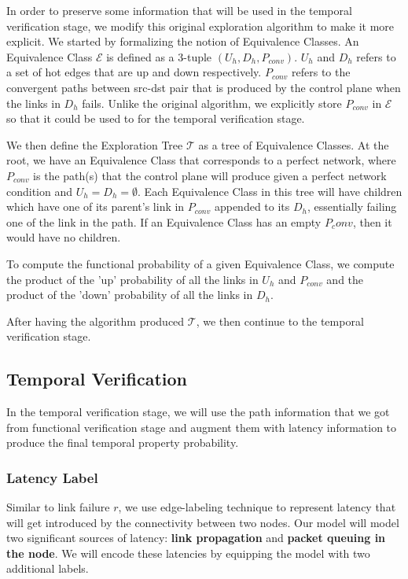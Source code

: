 \documentclass[10pt,sigconf,letterpaper,anonymous,nonacm]{acmart}
\begin{document}
In order to preserve some information that will be used in the temporal verification 
stage, we modify this original exploration algorithm to make it more explicit.
We started by formalizing the notion of Equivalence Classes.
An Equivalence Class $\mathcal{E}$ is defined as a 3-tuple $(U_h, D_h, P_{conv})$.
$U_h$ and $D_h$ refers to a set of hot edges that are up and down respectively.
$P_{conv}$ refers to the convergent paths between src-dst pair that is produced by the
control plane when the links in $D_h$ fails.
Unlike the original algorithm, we explicitly store $P_{conv}$ in $\mathcal{E}$ so that 
it could be used to for the temporal verification stage.

We then define the Exploration Tree $\mathcal{T}$ as a tree of Equivalence Classes.
At the root, we have an Equivalence Class that corresponds to a perfect network, where 
$P_{conv}$ is the path(s) that the control plane will produce given a perfect network 
condition and $U_h = D_h = \emptyset$.
Each Equivalence Class in this tree will have children which have one of its parent's link in 
$P_{conv}$ appended to its $D_h$, essentially failing one of the link in the path.
If an Equivalence Class has an empty $P_conv$, then it would have no children.

To compute the functional probability of a given Equivalence Class, we compute the 
product of the 'up' probability of all the links in $U_h$ and $P_{conv}$ and the 
product of the 'down' probability of all the links in $D_h$.

After having the algorithm produced $\mathcal{T}$, we then continue to the temporal verification 
stage.

\subsection{Temporal Verification}
In the temporal verification stage, we will use the path information that we got from 
functional verification stage and augment them with latency information to 
produce the final temporal property probability.

\subsubsection{Latency Label}
Similar to link failure $r$, we use edge-labeling technique to represent latency that 
will get introduced by the connectivity between two nodes. 
Our model will model two significant sources of latency: \textbf{link propagation} 
and \textbf{packet queuing in the node}.
We will encode these latencies by equipping the model with two additional labels.
\end{document}
